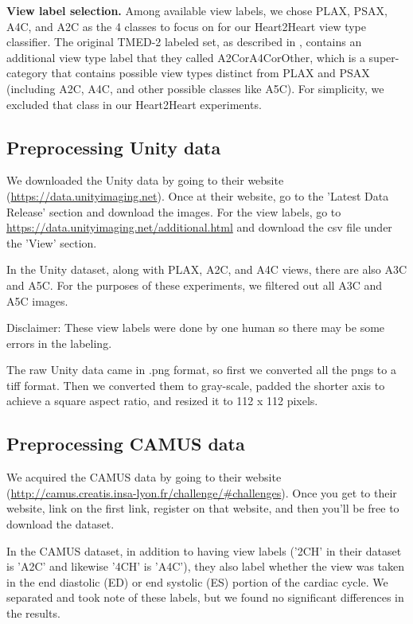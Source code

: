 \textbf{View label selection.}
Among available view labels, we chose PLAX, PSAX, A4C, and A2C as the 4 classes to focus on for our Heart2Heart view type classifier.
The original TMED-2 labeled set, as described in \citet{huangTMEDDatasetSemiSupervised2022}, contains an additional view type label that they called A2CorA4CorOther, which is a super-category that contains possible view types distinct from PLAX and PSAX (including A2C, A4C, and other possible classes like A5C).
For simplicity, we excluded that class in our Heart2Heart experiments.

\subsection{Preprocessing Unity data}

We downloaded the Unity data by going to their website (\url{https://data.unityimaging.net}). Once at their website, go to the 'Latest Data Release' section and download the images.
For the view labels, go to \url{https://data.unityimaging.net/additional.html} and download the csv file under the 'View' section. 

In the Unity dataset, along with PLAX, A2C, and A4C views, there are also A3C and A5C. For the purposes of these experiments, we filtered out all A3C and A5C images.

Disclaimer: These view labels were done by one human so there may be some errors in the labeling. 

The raw Unity data came in .png format, so first we converted all the pngs to a tiff format.
Then we converted them to gray-scale, padded the shorter axis to achieve a square aspect ratio, and resized it to 112 x 112 pixels. 



\subsection{Preprocessing CAMUS data}


We acquired the CAMUS data by going to their website (\url{http://camus.creatis.insa-lyon.fr/challenge/#challenges}). Once you get to their website, link on the first link, register on that website, and then you'll be free to download the dataset. 

In the CAMUS dataset, in addition to having view labels ('2CH' in their dataset is 'A2C' and likewise '4CH' is 'A4C'), they also label whether the view was taken in the end diastolic (ED) or end systolic (ES) portion of the cardiac cycle. We separated and took note of these labels, but we found no significant differences in the results.  

